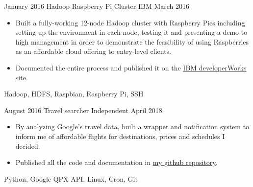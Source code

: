 \begin{projects}
    \emptySeparator

    \project
        {January 2016}
        {Hadoop Raspberry Pi Cluster}
        {IBM}
        {March 2016}
        {
            \begin{itemize}
                \item Built a fully-working 12-node Hadoop cluster with 
                    Raspberry Pies including setting up the environment in each 
                    node, testing it and presenting a demo to high management 
                    in order to demonstrate the feasibility of using 
                    Raspberries as an affordable cloud offering to entry-level 
                    clients.
                \item Documented the entire process and published it on the 
                    \href{https://developer.ibm.com/recipes/tutorials/building-a-hadoop-cluster-with-raspberry-pi/}
                    {\underline{IBM developerWorks site}}.
            \end{itemize}
        }
        {
            Hadoop,
            HDFS,
            Raspbian,
            Raspberry Pi,
            SSH
        }

    \emptySeparator

    \project
        {August 2016}
        {Travel searcher}
        {Independent}
        {April 2018}
        {
            \begin{itemize}
                \item By analyzing Google's travel data, built a wrapper and 
                    notification system to inform me of affordable flights for 
                    destinations, prices and schedules I decided.
                \item Published all the code and documentation in 
                    \href{https://github.com/alanverdugo/QPX}{\underline{my 
                    github repository}}.
            \end{itemize}
        }
        {
            Python,
            Google QPX API,
            Linux,
            Cron,
            Git
        }

\end{projects}
